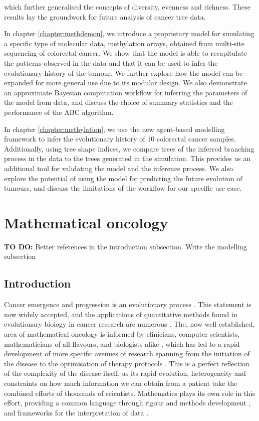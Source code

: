 which further generalised the concepts of diversity, evenness and richness. These results lay the groundwork for
future analysis of cancer tree data.\par
In chapter \ref{chapter:methdemon}, we introduce a proprietary model for simulating a specific type of molecular data, methylation arrays, obtained from
multi-site sequencing of colorectal cancer. We show that the model is able to recapitulate the patterns observed in the
data and that it can be used to infer the evolutionary history of the tumour. We further explore how the model can be expanded
for more general use due to its modular design. We also demonstrate an approximate Bayesian computation workflow for inferring
the parameters of the model from data, and discuss the choice of summary statistics and the performance of the ABC algorithm.\par
In chapter \ref{chapter:methylation}, we use the new agent-based modelling framework to infer the evolutionary history of
$10$ colorectal cancer samples. Additionally, using tree shape indices, we compare trees of the inferred branching process in the data to the trees
generated in the simulation. This provides us an additional tool for validating the model and the inference process. We also
explore the potential of using the model for predicting the future evolution of tumours, and discuss the limitations of the
workflow for our specific use case.\par


\section{Mathematical oncology}
\textbf{TO DO:} Better references in the introduction subsection. Write the modelling subsection
\subsection{Introduction}
Cancer emergence and progression is an evolutionary process \cite{nowell_clonal_1976, merlo_cancer_2006}.
This statement is now widely accepted, and the applications of quantitative methods found in evolutionary
biology in cancer research are numerous \cite{rockne_2019_2019, yin_review_2019, kourou_applied_2021}.
The, now well established, area of mathematical oncology is informed by clinicians, computer scientists,
mathematicians of all flavours, and biologists alike \cite{bull_hallmarks_2022}, which has led to a rapid
development of more specific avenues of research spanning from the initiation of the disease
\cite{paterson_mathematical_2020} to the optimisation of therapy protocols
\cite{west_survey_2023}. This is a perfect reflection of the complexity
of the disease itself, as its rapid evolution, heterogeneity and constraints on
how much information we can obtain from a patient take
the combined efforts of thousands of scientists. Mathematics plays its own role in this effort, providing
a common language through rigour and methods development \cite{},
and frameworks for the interpretation of data \cite{}.

